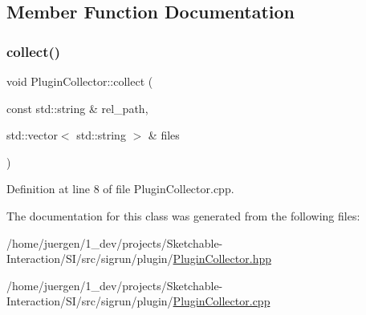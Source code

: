 \subsection{Member Function Documentation}
\mbox{\label{class_plugin_collector_ae96e3b7e48388cf5acddfc8ca750394e}} 
\subsubsection{\texorpdfstring{collect()}{collect()}}
{\footnotesize\ttfamily void Plugin\+Collector\+::collect (\begin{DoxyParamCaption}\item[{const std\+::string \&}]{rel\+\_\+path,  }\item[{std\+::vector$<$ std\+::string $>$ \&}]{files }\end{DoxyParamCaption})}



Definition at line 8 of file Plugin\+Collector.\+cpp.



The documentation for this class was generated from the following files\+:\begin{DoxyCompactItemize}
\item 
/home/juergen/1\+\_\+dev/projects/\+Sketchable-\/\+Interaction/\+S\+I/src/sigrun/plugin/\mbox{\hyperlink{_plugin_collector_8hpp}{Plugin\+Collector.\+hpp}}\item 
/home/juergen/1\+\_\+dev/projects/\+Sketchable-\/\+Interaction/\+S\+I/src/sigrun/plugin/\mbox{\hyperlink{_plugin_collector_8cpp}{Plugin\+Collector.\+cpp}}\end{DoxyCompactItemize}
